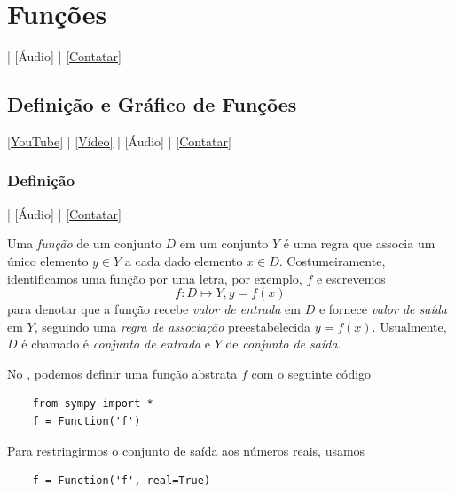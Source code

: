 
\chapter{Funções}\label{cap_funcao}
\thispagestyle{fancy}

\begin{flushright}
  [Vídeo] | [Áudio] | \href{https://phkonzen.github.io/notas/contato.html}{[Contatar]}
\end{flushright}

\section{Definição e Gráfico de Funções}\label{cap_funcao_sec_defgrafico}

\begin{flushright}
  \href{https://youtu.be/eB1OFoJ3OG8}{[YouTube]} | \href{https://archive.org/details/fundef}{[Vídeo]} | [Áudio] | \href{https://phkonzen.github.io/notas/contato.html}{[Contatar]}
\end{flushright}

\subsection{Definição}

\begin{flushright}
  [Vídeo] | [Áudio] | \href{https://phkonzen.github.io/notas/contato.html}{[Contatar]}
\end{flushright}

Uma \emph{função} de um conjunto $D$ em um conjunto $Y$ é uma regra que associa um único elemento $y\in Y$ a cada dado elemento $x\in D$. Costumeiramente, identificamos uma função por uma letra, por exemplo, $f$ e escrevemos
\begin{equation}
  f:D\mapsto Y, y=f(x)
\end{equation}
para denotar que a função recebe \emph{valor de entrada} em $D$ e fornece \emph{valor de saída} em $Y$, seguindo uma \emph{regra de associação} preestabelecida $y=f(x)$. Usualmente, $D$ é chamado é \emph{conjunto de entrada} e $Y$ de \emph{conjunto de saída}.

\ifispython
\begin{obs}
  No \python, podemos definir uma função abstrata $f$ com o seguinte código
  \begin{lstlisting}
    from sympy import *
    f = Function('f')
  \end{lstlisting}
  Para restringirmos o conjunto de saída aos números reais, usamos
  \begin{lstlisting}
    f = Function('f', real=True)
  \end{lstlisting}  
\end{obs}
\fi

